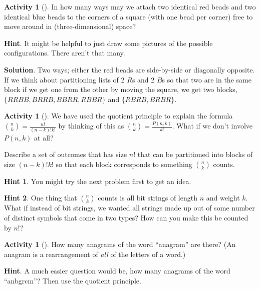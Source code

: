 \documentclass[10pt,]{book}
\theoremstyle{plain}
\theoremstyle{definition}
\theoremstyle{definition}
\theoremstyle{definition}
\newtheorem{activity}[project]{Activity}
\numberwithin{equation}{chapter}
\begin{document}
\begin{activity}[]\label{twocolorsofbeads}
\hypertarget{p-781}{}%
In how many ways may we attach two identical red beads and two identical blue beads to the corners of a square (with one bead per corner) free to move around in (three-dimensional) space?%
\par\smallskip%
\noindent\textbf{Hint}.\hypertarget{hint-69}{}\quad%
\hypertarget{p-782}{}%
It might be helpful to just draw some pictures of the possible configurations. There aren't that many.%
\par\smallskip%
\noindent\textbf{Solution}.\hypertarget{solution-60}{}\quad%
\hypertarget{p-783}{}%
Two ways; either the red beads are side-by-side or diagonally opposite. If we think about partitioning lists of 2 \(R\)s and 2 \(B\)s so that two are in the same block if we get one from the other by moving the square, we get two blocks, \(\{RRBB, BRRB, BBRR, RBBR\}\) and \(\{RBRB, BRBR\}\).%
\end{activity}
\begin{activity}[]\label{activity-107}
\hypertarget{p-784}{}%
We have used the quotient principle to explain the formula \(\binom{n}{k} = \frac{n!}{(n-k)!k!}\) by thinking of this as \(\binom{n}{k} = \frac{P(n,k)}{k!}\).  What if we don't involve \(P(n,k)\) at all?%
\par
\hypertarget{p-785}{}%
Describe a set of outcomes that has size \(n!\) that can be partitioned into blocks of size \((n-k)!k!\) so that each block corresponds to something \(\binom{n}{k}\) counts.%
\par\smallskip%
\noindent\textbf{Hint 1}.\hypertarget{hint-70}{}\quad%
\hypertarget{p-786}{}%
You might try the next problem first to get an idea.%
\par\smallskip%
\noindent\textbf{Hint 2}.\hypertarget{hint-71}{}\quad%
\hypertarget{p-787}{}%
One thing that \(\binom{n}{k}\) counts is all bit strings of length \(n\) and weight \(k\).  What if instead of bit strings, we wanted all strings made up out of some number of distinct symbols that come in two types?  How can you make this be counted by \(n!\)?%
\end{activity}
\begin{activity}[]\label{activity-108}
\hypertarget{p-788}{}%
How many anagrams of the word ``anagram'' are there? (An anagram is a rearrangement of \emph{all} of the letters of a word.)%
\par\smallskip%
\noindent\textbf{Hint}.\hypertarget{hint-72}{}\quad%
\hypertarget{p-789}{}%
A much easier question would be, how many anagrams of the word ``anbgrcm''?  Then use the quotient principle.%
\end{activity}
\typeout{************************************************}
\typeout{************************************************}
\end{document}
